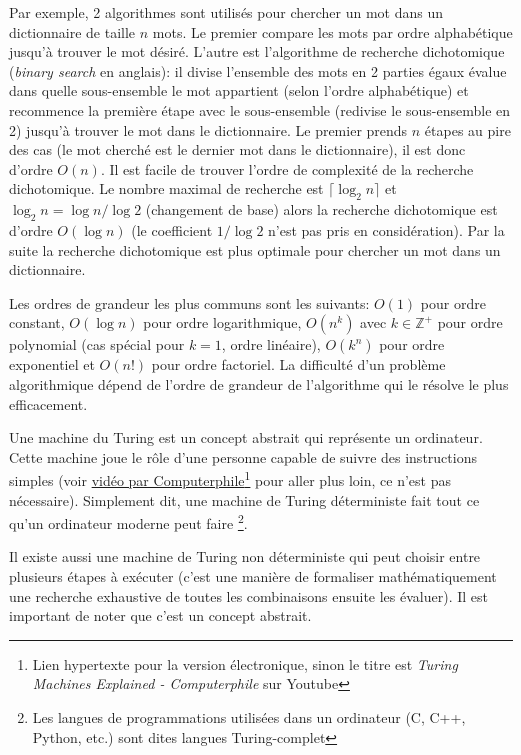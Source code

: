\documentclass[../main.tex]{subfiles}
\begin{document}
Par exemple, 2 algorithmes sont utilisés pour chercher un mot dans un dictionnaire de taille $n$ mots. Le premier compare les mots par ordre alphabétique jusqu'à trouver le mot désiré. L'autre est l'algorithme de recherche dichotomique (\emph{binary search} en anglais): il divise l'ensemble des mots en 2 parties égaux évalue dans quelle sous-ensemble le mot appartient (selon l'ordre alphabétique) et recommence la première étape avec le sous-ensemble (redivise le sous-ensemble en 2) jusqu'à trouver le mot dans le dictionnaire. Le premier prends $n$ étapes au pire des cas (le mot cherché est le dernier mot dans le dictionnaire), il est donc d'ordre $O(n)$. Il est facile de trouver l'ordre de complexité de la recherche dichotomique. Le nombre maximal de recherche est $\lceil \log _2 n \rceil$ et $\log _2 n = \log n / \log 2$ (changement de base) alors la recherche dichotomique est d'ordre $O(\log n)$ (le coefficient $1/\log 2$ n'est pas pris en considération). Par la suite la recherche dichotomique est plus optimale pour chercher un mot dans un dictionnaire.

Les ordres de grandeur les plus communs sont les suivants: $O(1)$ pour ordre constant, $O(\log n)$ pour ordre logarithmique, $O(n^k)$ avec $k \in \mathbb{Z}^+$ pour ordre polynomial (cas spécial pour $k=1$, ordre linéaire), $O(k^n)$ pour ordre exponentiel et $O(n!)$ pour ordre factoriel. La difficulté d'un problème algorithmique dépend de l'ordre de grandeur de l'algorithme qui le résolve le plus efficacement.

\begin{definition}
Une machine du Turing est un concept abstrait qui représente un ordinateur. Cette machine joue le rôle d'une personne capable de suivre des instructions simples (voir \href{https://www.youtube.com/watch?v=dNRDvLACg5Q}{vidéo par Computerphile}\footnote{Lien hypertexte pour la version électronique, sinon le titre est \emph{Turing Machines Explained - Computerphile} sur Youtube} pour aller plus loin, ce n'est pas nécessaire). Simplement dit, une machine de Turing déterministe fait tout ce qu'un ordinateur moderne peut faire \footnote{Les langues de programmations utilisées dans un ordinateur (C, C++, Python, etc.) sont dites langues Turing-complet}.
\end{definition}

Il existe aussi une machine de Turing non déterministe qui peut choisir entre plusieurs étapes à exécuter (c'est une manière de formaliser mathématiquement une recherche exhaustive de toutes les combinaisons ensuite les évaluer). Il est important de noter que c'est un concept abstrait.
\end{document}
